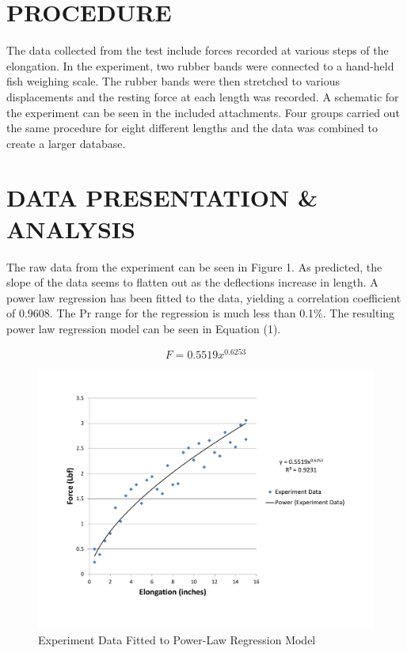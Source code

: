 \documentclass[12pt]{article}
\begin{document}
\section*{\fontsize{12}{12}\selectfont PROCEDURE}
The data collected from the test include forces recorded at various steps of the elongation. In the experiment, two rubber bands were connected to a hand-held fish weighing scale. The rubber bands were then stretched to various displacements and the resting force at each length was recorded. A schematic for the experiment can be seen in the included attachments. Four groups carried out the same procedure for eight different lengths and the data was combined to create a larger database.


\section*{\fontsize{12}{12}\selectfont DATA PRESENTATION \& ANALYSIS}
The raw data from the experiment can be seen in Figure 1. As predicted, the slope of the data seems to flatten out as the deflections increase in length. A power law regression has been fitted to the data, yielding a correlation coefficient of 0.9608. The Pr range for the regression is much less than 0.1\%. The resulting power law regression model can be seen in Equation (1). 
\bigskip

\begin{equation}
F = 0.5519x^{0.6253}
\end{equation}

\begin{figure}[t!] %
   \centering
   \includegraphics[width=\linewidth]{power_regression.pdf} 
   \caption{Experiment Data Fitted to Power-Law Regression Model}
   \label{fig:example}
\end{figure}
\end{document}
